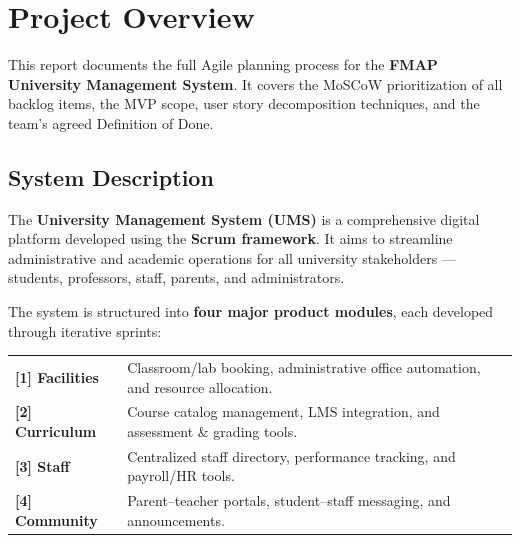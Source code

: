 \documentclass[12pt, a4paper]{article}
\begin{document}
\pagecolor{white}\color{black}

\newpage
\begin{tcolorbox}[enhanced,colback=agileblue!5,colframe=agileblue,boxrule=1.5pt,arc=6pt,title={$\equiv$ Table of Contents},fonttitle=\bfseries\large\color{white},attach boxed title to top left={yshift=-4mm,xshift=8mm},boxed title style={colback=agileblue,arc=3pt},left=16pt,right=10pt,top=10pt,bottom=10pt,width=\textwidth-2pt]
\makeatletter{}\makeatother
\end{tcolorbox}

\newpage
\section{Project Overview}

\begin{tcolorbox}[notebox,title={\textcircled{\footnotesize i}\quad About This Document}]
This report documents the full Agile planning process for the \textbf{FMAP University Management System}. It covers the MoSCoW prioritization of all backlog items, the MVP scope, user story decomposition techniques, and the team's agreed Definition of Done.
\end{tcolorbox}

\subsection{System Description}

The \textbf{University Management System (UMS)} is a comprehensive digital platform developed using the \textbf{Scrum framework}. It aims to streamline administrative and academic operations for all university stakeholders --- students, professors, staff, parents, and administrators.

The system is structured into \textbf{four major product modules}, each developed through iterative sprints:

\vspace{4pt}
\begin{tcolorbox}[enhanced,colback=agilecyan!6,colframe=agilecyan,boxrule=1pt,arc=5pt]
\begin{tabular}{@{}L{0.22\textwidth}L{0.72\textwidth}@{}}
\textbf{\color{agileblue}[1] Facilities} & Classroom/lab booking, administrative office automation, and resource allocation. \\[6pt]
\textbf{\color{agileblue}[2] Curriculum} & Course catalog management, LMS integration, and assessment \& grading tools. \\[6pt]
\textbf{\color{agileblue}[3] Staff} & Centralized staff directory, performance tracking, and payroll/HR tools. \\[6pt]
\textbf{\color{agileblue}[4] Community} & Parent--teacher portals, student--staff messaging, and announcements. \\
\end{tabular}
\end{tcolorbox}
\end{document}

